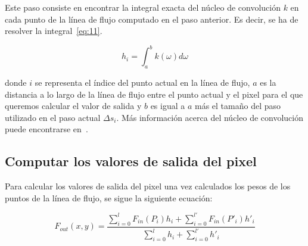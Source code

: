 Este paso consiste en encontrar la integral exacta del núcleo de convolución $k$
en cada punto de la línea de flujo computado en el paso anterior. Es decir, se
ha de resolver la integral~\eqref{eq:11}.

\begin{equation}
		h_i = \int_{a}^{b}k(\omega) d\omega \label{eq:11}
\end{equation}

donde $i$ se representa el índice del punto actual en la línea de flujo, $a$
es la distancia a lo largo de la línea de flujo entre el punto actual y el pixel
para el que queremos calcular el valor de salida y $b$ es igual a $a$ más el
tamaño del paso utilizado en el paso actual $\Delta s_i$. Más información acerca
del núcleo de convolución puede encontrarse en~\citet{osti_10185520}.

\subsection{Computar los valores de salida del pixel}
\label{ref:salida}

Para calcular los valores de salida del pixel una vez calculados los pesos de
los puntos de la línea de flujo, se sigue la siguiente ecuación:

\begin{equation}
		F_{out}(x,y) =
		\frac{\sum\limits_{i=0}^{l}{F_{in}(P_i)h_i}+\sum\limits_{i=0}^{l'}{F_{in}(P'_i)h'_i}}{\sum\limits_{i=0}^{l}{h_i} + \sum\limits_{i=0}^{l'}{h'_i}} \label{eq:12}
\end{equation}
